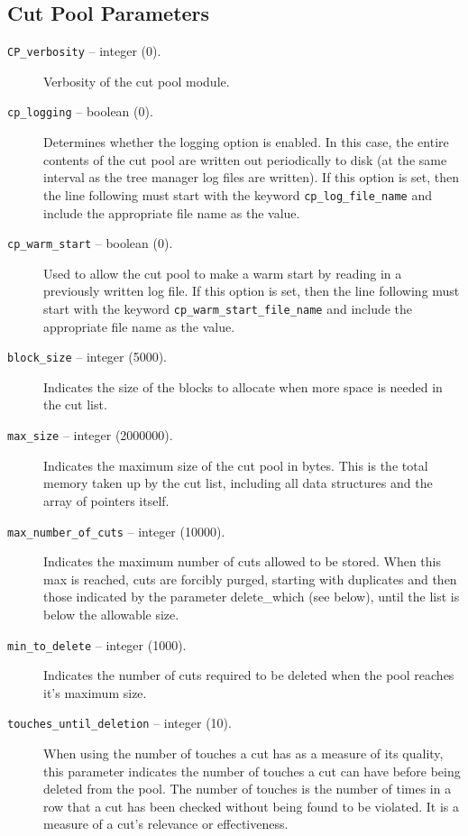\subsection{Cut Pool Parameters}
\label{cut_pool_params}
\begin{description}

\item[{\tt CP\_verbosity} -- integer (0).]
Verbosity of the cut pool module.

\item[{\tt cp\_logging} -- boolean (0).]
Determines whether the logging option is enabled. In this case, the
entire contents of the cut pool are written out periodically to disk
(at the same interval as the tree manager log files are written). If
this option is set, then the line following must start with the
keyword {\tt cp\_log\_file\_name} and include the appropriate
file name as the value.

\item[{\tt cp\_warm\_start} -- boolean (0).]
Used to allow the cut pool to make a warm start by reading in a
previously written log file. If
this option is set, then the line following must start with the
keyword {\tt cp\_warm\_start\_file\_name} and include the appropriate
file name as the value.

\item[{\tt block\_size} -- integer (5000).]
Indicates the size of the blocks to allocate when more space is needed
in the cut list.

\item[{\tt max\_size} -- integer (2000000).]
Indicates the maximum size of the cut pool in bytes. This is the total
memory taken up by the cut list, including all data structures and the
array of pointers itself.

\item[{\tt max\_number\_of\_cuts} -- integer (10000).]
Indicates the maximum number of cuts allowed to be stored. When this
max is reached, cuts are forcibly purged, starting with duplicates
and then those indicated by the parameter 
{delete_which} (see below), until the list is below the allowable size.

\item[{\tt min\_to\_delete} -- integer (1000).]
Indicates the number of cuts required to be deleted when the pool reaches
it's maximum size.

\item[{\tt touches\_until\_deletion} -- integer (10).]
When using the number of touches a cut has as a measure of its
quality, this parameter indicates the number of touches a cut can have
before being deleted from the pool. The number of touches is the
number of times in a row that a cut has been checked without being
found to be violated. It is a measure of a cut's relevance or
effectiveness.


\end{description}
